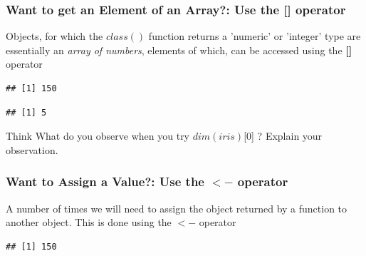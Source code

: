 \subsubsection{Want to get an Element of an Array?: Use the [] operator}
\noindent Objects, for which the $class()$ function returns a 'numeric' or 'integer' type are essentially an \emph{array of numbers}, elements of which, can be accessed using the \textbf{[]} operator     
\begin{knitrout}
\color{fgcolor}\begin{kframe}
\begin{alltt}
\hlstd{(iris)[}\hlstd{]}
\end{alltt}
\begin{verbatim}
## [1] 150
\end{verbatim}
\begin{alltt}
\hlstd{(iris)[}\hlstd{]}
\end{alltt}
\begin{verbatim}
## [1] 5
\end{verbatim}
\end{kframe}
\end{knitrout}

\begin{DIY}{Think}
What do you observe when you try $dim(iris)$[0] ? Explain your observation. 
\end{DIY}
\subsubsection{Want to Assign a Value?: Use the $<-$ operator}
\noindent A number of times we will need to assign the object returned by a function to another object. This is done using the $<-$ operator 
\begin{knitrout}
\color{fgcolor}\begin{kframe}
\begin{alltt}
 \hlkwb{<-} \hlstd{(iris)[}\hlstd{]}
\end{alltt}
\begin{verbatim}
## [1] 150
\end{verbatim}
\end{kframe}
\end{knitrout}


